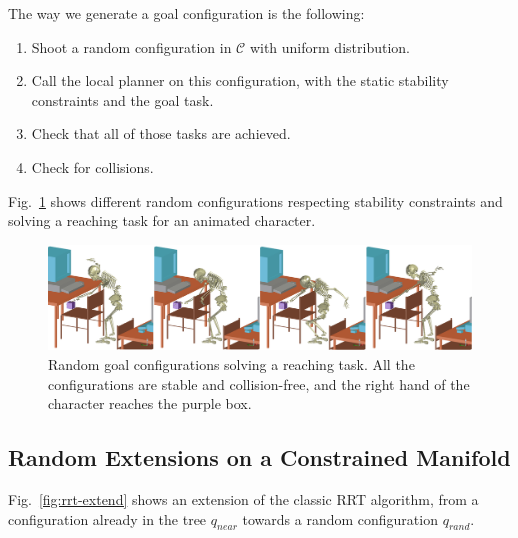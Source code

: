\documentclass{article}
\begin{document}
The way we generate a goal configuration is the following:
\begin{enumerate}
\item Shoot a random configuration in $\mathcal{C}$ with uniform distribution.
\item Call the local planner on this configuration, with the static
  stability constraints and the goal task.
\item Check that all of those tasks are achieved.
\item Check for collisions.
\end{enumerate}

Fig.~\ref{fig:goal} shows different random configurations respecting stability 
constraints and solving a reaching task for an animated character. 

\begin{figure}[h]
\centering
\includegraphics[width=\linewidth]{pics/goal.png}

\caption{Random goal configurations solving a reaching task. All the
  configurations are stable and collision-free, and the right hand of the character
  reaches the purple box.}
\label{fig:goal}
\end{figure}



\subsection{Random Extensions on a Constrained Manifold}
\label{sec:extension}



Fig.~\ref{fig:rrt-extend} shows an extension of the classic 
RRT algorithm, from a configuration already in the tree $q_{near}$ towards a random
configuration $q_{rand}$.
\end{document}
